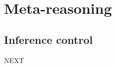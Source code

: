 \documentclass[aspectratio=169]{beamer}
\begin{document}
\section{Meta-reasoning}

\subsection{Inference control}

\begin{frame}
  NEXT
\end{frame}
\end{document}
